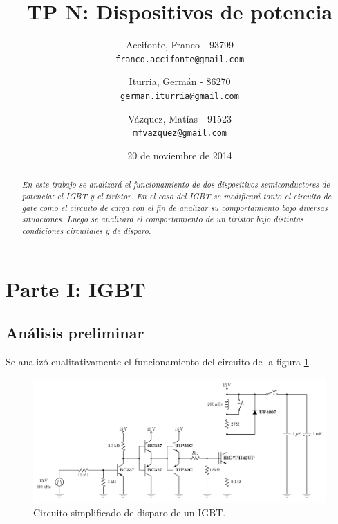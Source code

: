 \documentclass[10pt,spanish,a4paper,openany,notitlepage]{article}
\begin{document}
\title{\textbf{TP N: Dispositivos de potencia}}
\author{
  Accifonte, Franco - 93799\\
  \texttt{franco.accifonte@gmail.com}  
  \and
  Iturria, Germán  - 86270 \\
  \texttt{german.iturria@gmail.com}
  \and
   Vázquez, Matías - 91523\\
  \texttt{mfvazquez@gmail.com}
}
\date{20 de noviembre de 2014}
\maketitle

\begin{abstract} %
\emph{En este trabajo se analizará el funcionamiento de dos dispositivos 
semiconductores de potencia: el IGBT y el tiristor. En el caso del IGBT 
se modificará tanto el circuito de gate como el circuito de carga con 
el fin de analizar su comportamiento bajo diversas situaciones.
Luego se analizará el comportamiento de un tiristor bajo distintas 
condiciones circuitales y de disparo.}
\end{abstract}

\section{Parte I: IGBT}

\subsection{Análisis preliminar}

Se analizó cualitativamente el funcionamiento del circuito de la figura
\ref{fig:igbt}.

\begin{figure}[H]
\centering
\includegraphics[scale=0.23]{./imagenes/igbt.png}
\caption{Circuito simplificado de disparo de un IGBT.}
\label{fig:igbt}
\end{figure}
\end{document}
